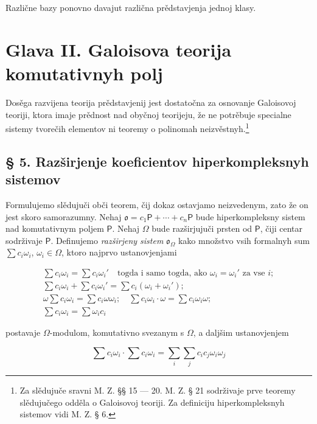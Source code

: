 \documentclass[11pt]{article}
\newcommand{\srcfn}[2]{\footnote{#2}}
\begin{document}
Različne bazy ponovno davajut različna prědstavjenja jednoj klasy.

\section*{Glava II. Galoisova teorija komutativnyh polj}\label{kapitel-ii.-galoissche-theorie-kommutativer-koerper}

Dosěga razvijena teorija prědstavjenij jest dostatočna za osnovanje Galoisovoj teoriji, ktora imaje prědnost nad obyčnoj teorijeju, že ne potrěbuje specialne sistemy tvorečih elementov ni teoremy o polinomah neizvěstnyh.\srcfn{1}{Za slědujuče sravni M. Z. §§ 15 --- 20. M. Z. § 21 sodrživaje prve teoremy slědujučego odděla o Galoisovoj teoriji. Za definiciju hiperkompleksnyh sistemov vidi M. Z. § 6.}

\subsection*{§ 5. Razširjenje koeficientov hiperkompleksnyh sistemov}\label{koeffizientenerweiterung-hyperkomplexer-systeme}

Formulujemo slědujuči obči teorem, čij dokaz ostavjamo neizvedenym, zato že on jest skoro samorazumny. Nehaj \(\mathfrak{o}=c_1\mathsf P+\cdots+c_n\mathsf P\) bude hiperkompleksny sistem nad komutativnym poljem \(\mathsf P\). Nehaj \(\Omega\) bude razširjujuči prsten od \(\mathsf P\), čiji centar sodrživaje \(\mathsf P\). Definujemo \emph{razširjeny sistem} \(\mathfrak{o}_{\Omega}\) kako množstvo vsih formalnyh sum \(\sum c_i\omega_i\), \(\omega_i\in\Omega\), ktoro najprvo ustanovjenjami

\[
\begin{array}{l}
\sum c_i\omega_i=\sum c_i\omega_i' \quad\text{togda i samo togda, ako } \omega_i=\omega_i' \text{ za vse } i;\\
\sum c_i\omega_i+\sum c_i\omega_i'=\sum c_i(\omega_i+\omega_i');\\
\omega\sum c_i\omega_i=\sum c_i\omega\omega_i;\quad
\sum c_i\omega_i\cdot\omega=\sum c_i\omega_i\omega;\\
\sum c_i\omega_i=\sum \omega_i c_i
\end{array}
\]

postavaje \(\Omega\)-modulom, komutativno svezanym s \(\Omega\), a daljšim ustanovjenjem

\[
\sum c_i\omega_i\cdot \sum c_i\omega_i
=\sum_i\sum_j c_ic_j\omega_i\omega_j
\]
\end{document}
